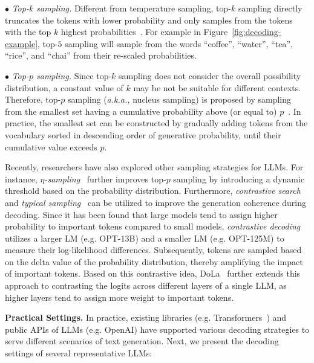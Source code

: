 $\bullet$ \emph{Top-$k$ sampling.} Different from temperature sampling, top-$k$ sampling directly truncates the tokens with lower probability and only samples from the tokens with the top $k$ highest probabilities~\cite{Fan-2018-ACL-Hierarchical}. For example in Figure~\ref{fig:decoding-example}, top-$5$ sampling will sample from the words ``coffee'', ``water'', ``tea'', ``rice'', and ``chai'' from their re-scaled probabilities.

$\bullet$ \emph{Top-$p$ sampling.} Since top-$k$ sampling does not consider the overall  possibility distribution, a constant value of  $k$  may be not be suitable for different contexts. Therefore, top-$p$ sampling (\emph{a.k.a.,} nucleus sampling) is proposed by sampling from the smallest set having a cumulative probability above (or equal to) $p$~\cite{Holtzman-2020-ICLR-The}. In practice, the smallest set can be constructed by gradually adding tokens from the vocabulary sorted in descending order of generative probability, until their cumulative value exceeds $p$.

Recently, researchers have also explored other sampling strategies for LLMs. For instance, \emph{$\eta$-sampling}~\cite{Hewitt-emnlp-2022-Truncation} further improves top-$p$ sampling by introducing a dynamic threshold based on the probability distribution. Furthermore, \emph{contrastive search}~\cite{Su-2022-NIPS-A} and \emph{typical sampling}~\cite{Meister-TACL-2023-Locally} can be utilized to improve the generation coherence during decoding. {Since it has been found that large models tend to assign higher probability to important tokens compared to small models, \emph{contrastive decoding}~\cite{Li-ACL-2023-Contrastive} utilizes a larger LM (e.g. OPT-13B) and a smaller LM (e.g. OPT-125M) to measure their log-likelihood differences. Subsequently, tokens are sampled based on the delta value of the probability distribution, thereby amplifying the impact of important tokens.} {Based on this contrastive idea, DoLa~\cite{Chuang-arxiv-2023-DoLa} further extends this approach to contrasting the logits across different layers of a single LLM, as higher layers tend to assign more weight to important tokens.}

\textbf{Practical Settings.} In practice, existing libraries (e.g. Transformers~\cite{Wolf-EMNLP-2020-Transformers}) and public APIs of LLMs (e.g. OpenAI) have supported various decoding strategies to serve different scenarios of text generation. Next, we present the decoding settings of several representative LLMs: 


